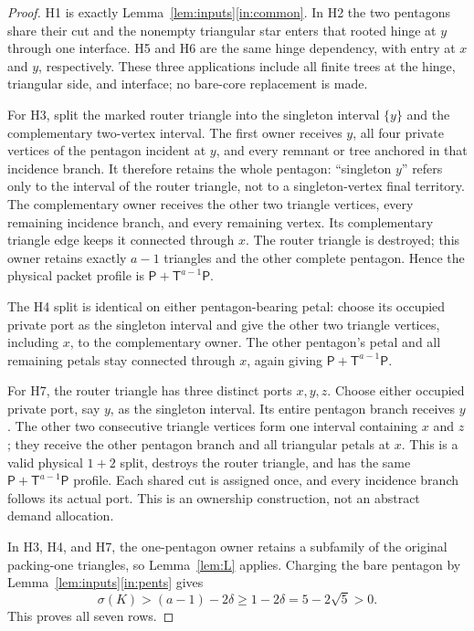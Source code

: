 \documentclass[11pt]{article}
\theoremstyle{remark}
\newcommand{\sig}{\sigma}
\newcommand{\T}{\mathsf T}
\newcommand{\Pp}{\mathsf P}
\begin{document}
\begin{proof}
H1 is exactly Lemma~\ref{lem:inputs}\ref{in:common}.  In H2 the two
pentagons share their cut and the nonempty triangular star enters that rooted
hinge at $y$ through one interface.  H5 and H6 are the same hinge dependency,
with entry at $x$ and $y$, respectively.  These three applications include all
finite trees at the hinge, triangular side, and interface; no bare-core
replacement is made.

For H3, split the marked router triangle into the singleton interval $\{y\}$
and the complementary two-vertex interval.  The first owner receives $y$, all
four private vertices of the pentagon incident at $y$, and every remnant or
tree anchored in that incidence branch.  It therefore retains the whole
pentagon: ``singleton $y$'' refers only to the interval of the router triangle,
not to a singleton-vertex final territory.  The complementary owner receives
the other two triangle vertices, every remaining incidence branch, and every
remaining vertex.  Its complementary triangle edge keeps it connected through
$x$.  The router triangle is destroyed; this owner retains exactly $a-1$
triangles and the other complete pentagon.  Hence the physical packet profile
is $\Pp+\T^{a-1}\Pp$.

The H4 split is identical on either pentagon-bearing petal: choose its occupied
private port as the singleton interval and give the other two triangle
vertices, including $x$, to the complementary owner.  The other pentagon's
petal and all remaining petals stay connected through $x$, again giving
$\Pp+\T^{a-1}\Pp$.

For H7, the router triangle has three distinct ports $x,y,z$.  Choose either
occupied private port, say $y$, as the singleton interval.  Its entire
pentagon branch receives $y$.  The other two consecutive triangle vertices
form one interval containing $x$ and $z$; they receive the other pentagon
branch and all triangular petals at $x$.  This is a valid physical $1+2$
split, destroys the router triangle, and has the same
$\Pp+\T^{a-1}\Pp$ profile.  Each shared cut is assigned once, and every
incidence branch follows its actual port.  This is an ownership construction,
not an abstract demand allocation.

In H3, H4, and H7, the one-pentagon owner retains a subfamily of the original
packing-one triangles, so Lemma~\ref{lem:L} applies.  Charging the bare
pentagon by Lemma~\ref{lem:inputs}\ref{in:pents} gives
\[
 \sig(K)>(a-1)-2\delta
 \geq1-2\delta=5-2\sqrt5>0.                              \tag{6.1}
\]
This proves all seven rows.
\end{proof}
\end{document}
